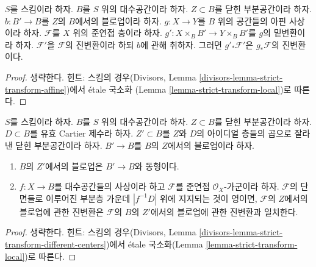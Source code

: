 \begin{lemma}
\label{lemma-strict-transform-affine}
$S$를 스킴이라 하자. $B$를 $S$ 위의 대수공간이라 하자.
$Z \subset B$를 닫힌 부분공간이라 하자.
$b : B' \to B$를 $Z$의 $B$에서의 블로업이라 하자.
$g : X \to Y$를 $B$ 위의 공간들의 아핀 사상이라 하자.
$\mathcal{F}$를 $X$ 위의 준연접 층이라 하자.
$g' : X \times_B B' \to Y \times_B B'$를 $g$의 밑변환이라 하자.
$\mathcal{F}'$을 $\mathcal{F}$의 진변환이라 하되 $b$에 관해 취하자.
그러면 $g'_*\mathcal{F}'$은 $g_*\mathcal{F}$의 진변환이다.
\end{lemma}

\begin{proof}
생략한다. 힌트: 스킴의 경우(Divisors, Lemma
\ref{divisors-lemma-strict-transform-affine})에서 \'etale 국소화
(Lemma \ref{lemma-strict-transform-local})로 따른다.
\end{proof}

\begin{lemma}
\label{lemma-strict-transform-different-centers}
$S$를 스킴이라 하자. $B$를 $S$ 위의 대수공간이라 하자.
$Z \subset B$를 닫힌 부분공간이라 하자.
$D \subset B$를 유효 Cartier 제수라 하자.
$Z' \subset B$를 $Z$와 $D$의 아이디얼 층들의 곱으로 잘라 낸
닫힌 부분공간이라 하자. $B' \to B$를 $B$의 $Z$에서의 블로업이라 하자.
\begin{enumerate}
\item $B$의 $Z'$에서의 블로업은 $B' \to B$와 동형이다.
\item $f : X \to B$를 대수공간들의 사상이라 하고 $\mathcal{F}$를
준연접 $\mathcal{O}_X$-가군이라 하자. $\mathcal{F}$의 단면들로 이루어진
부분층 가운데 $|f^{-1}D|$ 위에 지지되는 것이 영이면,
$\mathcal{F}$의 $Z$에서의 블로업에 관한 진변환은 $\mathcal{F}$의
$B$의 $Z'$에서의 블로업에 관한 진변환과 일치한다.
\end{enumerate}
\end{lemma}

\begin{proof}
생략한다. 힌트: 스킴의 경우(Divisors, Lemma
\ref{divisors-lemma-strict-transform-different-centers})에서 \'etale
국소화(Lemma \ref{lemma-strict-transform-local})로 따른다.
\end{proof}


